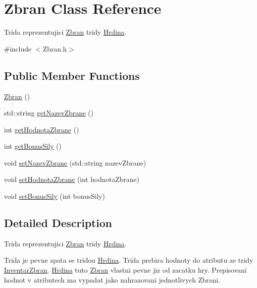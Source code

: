 \hypertarget{class_zbran}{\section{Zbran Class Reference}
\label{class_zbran}
}


Trida reprezentujici \hyperlink{class_zbran}{Zbran} tridy \hyperlink{class_hrdina}{Hrdina}.  




{\ttfamily \#include $<$Zbran.\-h$>$}

\subsection*{Public Member Functions}
\begin{DoxyCompactItemize}
\item 
\hyperlink{class_zbran_a2ca22a1a7e704b3119b2cc20901ffd76}{Zbran} ()
\item 
std\-::string \hyperlink{class_zbran_a5b4a43dfdcc555edda171a3b044c5aa7}{get\-Nazev\-Zbrane} ()
\item 
int \hyperlink{class_zbran_a9f9280f5434d1b8b4ca54f7eec1b140a}{get\-Hodnota\-Zbrane} ()
\item 
int \hyperlink{class_zbran_aced835cccce65078f42f5742c7ea19bf}{get\-Bonus\-Sily} ()
\item 
void \hyperlink{class_zbran_a16fd4f6a067786d1776d61fe1c67edb2}{set\-Nazev\-Zbrane} (std\-::string nazev\-Zbrane)
\item 
void \hyperlink{class_zbran_a05054ff43780dfb65493e8f74358f0fd}{set\-Hodnota\-Zbrane} (int hodnota\-Zbrane)
\item 
void \hyperlink{class_zbran_a3f12c407b59a41088297281b34de0f98}{set\-Bonus\-Sily} (int bonus\-Sily)
\end{DoxyCompactItemize}


\subsection{Detailed Description}
Trida reprezentujici \hyperlink{class_zbran}{Zbran} tridy \hyperlink{class_hrdina}{Hrdina}. 

Trida je pevne spata se tridou \hyperlink{class_hrdina}{Hrdina}. Trida prebira hodnoty do atributu ze tridy \hyperlink{class_inventar_zbran}{Inventar\-Zbran}. \hyperlink{class_hrdina}{Hrdina} tuto \hyperlink{class_zbran}{Zbran} vlastni pevne jiz od zacatku hry. Prepisovani hodnot v atributech ma vypadat jako nahrazovani jednotlivych Zbrani. 

